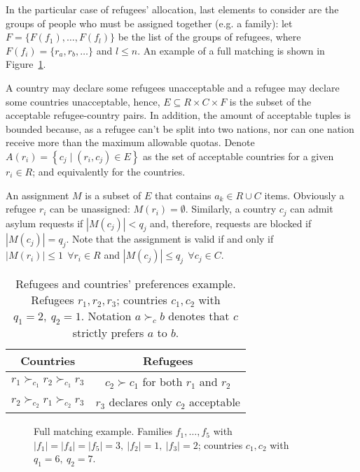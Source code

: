 In the particular case of refugees' allocation, last elements to consider are the groups of people who must be assigned together (e.g. a family): let \(F=\{F(f_1), \dots, F(f_l)\}\) be the list of the groups of refugees, where \(F(f_i) = \{r_a, r_b, \dots\}\) and \(l \leq n\).
An example of a full matching is shown in Figure~\ref{fig:complete_matching}.

A country may declare some refugees unacceptable and a refugee may declare some countries unacceptable, hence, \(E \subseteq R \times C \times F\) is the subset of the acceptable refugee-country pairs. In addition, the amount of acceptable tuples is bounded because, as a refugee can't be split into two nations, nor can one nation receive more than the maximum allowable quotas. Denote \(A \left( r_i \right) = \left\{ c_j \mid \left( r_i, c_j \right) \in E \right\}\) as the set of acceptable countries for a given \(r_i \in R\); and equivalently for the countries.

An assignment \(M\) is a subset of \(E\) that contains \(a_k \in R \cup C\) items. Obviously a refugee \(r_i\) can be unassigned: \(M \left( r_i \right) = \emptyset\). Similarly, a country \(c_j\) can admit asylum requests if \(\left| M \left( c_j \right) \right| < q_j\) and, therefore, requests are blocked if \(\left| M \left( c_j \right) \right| = q_j\). Note that the assignment is valid if and only if \(\left| M \left( r_i \right) \right| \leq 1\ \ \forall r_i \in R\) and \(\left| M \left( c_j \right) \right| \leq q_j\ \ \forall c_j \in C\).

\begin{table}[!htb]
    \centering
    \begin{tabular}{c|c}
        \hline Countries & Refugees \\
        \hline \(r_1 \succ_{c_1} r_2 \succ_{c_1} r_3\) & \(c_2 \succ c_1\) for both \(r_1\) and \(r_2\) \\
        \(r_2 \succ_{c_2} r_1 \succ_{c_2} r_3\) & \(r_3\) declares only \(c_2\) acceptable \\
        \hline
    \end{tabular}
    \caption{Refugees and countries' preferences example. Refugees \(r_1, r_2, r_3\); countries \(c_1, c_2\) with \(q_1 = 2,\ q_2 = 1\). Notation \(a \succ_c b\) denotes that \(c\) strictly prefers \(a\) to \(b\).}
    \label{tab:countries-refugees}
    \vspace{-2em}
\end{table}

\begin{figure}[!htb]
    \centering{%
        \resizebox{0.7\columnwidth}{!}{%
            \def\svgwidth{\columnwidth}%
        }
    }
    \caption{Full matching example. Families \(f_1, \dots, f_5\) with \(|f_1|=|f_4|=|f_5|=3,\ |f_2|=1,\ |f_3|=2\); countries \(c_1, c_2\) with \(q_1 = 6,\ q_2 = 7\).}
    \label{fig:complete_matching}
    \vspace{-1.5em}
\end{figure}
